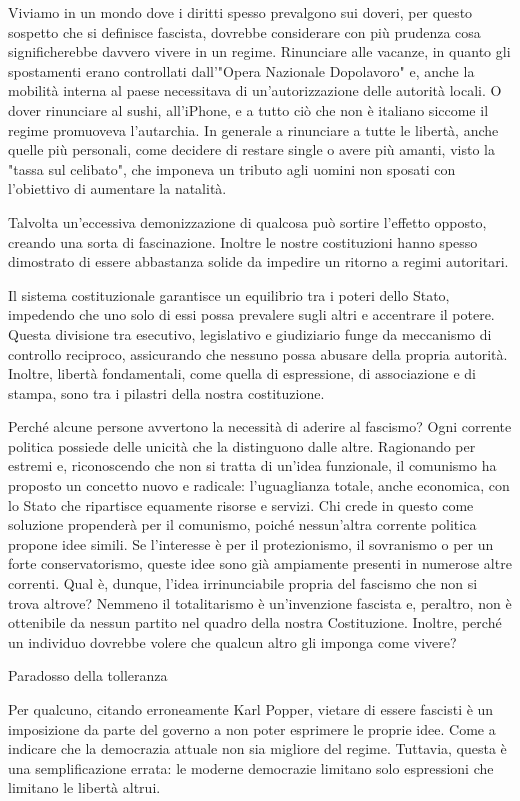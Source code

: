 \documentclass[12pt]{book} %
\begin{document}
Viviamo in un mondo dove i diritti spesso prevalgono sui doveri, per questo sospetto che si definisce fascista, dovrebbe considerare con più prudenza cosa significherebbe davvero vivere in un regime. Rinunciare alle vacanze, in quanto gli spostamenti erano controllati dall'"Opera Nazionale Dopolavoro" e, anche la mobilità interna al paese necessitava di un'autorizzazione delle autorità locali. O dover rinunciare al sushi, all'iPhone, e a tutto ciò che non è italiano siccome il regime promuoveva l'autarchia. In generale a rinunciare a tutte le libertà, anche quelle più personali, come decidere di restare single o avere più amanti, visto la "tassa sul celibato", che imponeva un tributo agli uomini non sposati con l'obiettivo di aumentare la natalità.

Talvolta un'eccessiva demonizzazione di qualcosa può sortire l’effetto opposto, creando una sorta di fascinazione. Inoltre le nostre costituzioni hanno spesso dimostrato di essere abbastanza solide da impedire un ritorno a regimi autoritari. 

Il sistema costituzionale garantisce un equilibrio tra i poteri dello Stato, impedendo che uno solo di essi possa prevalere sugli altri e accentrare il potere. Questa divisione tra esecutivo, legislativo e giudiziario funge da meccanismo di controllo reciproco, assicurando che nessuno possa abusare della propria autorità. Inoltre, libertà fondamentali, come quella di espressione, di associazione e di stampa, sono tra i pilastri della nostra costituzione.

Perché alcune persone avvertono la necessità di aderire al fascismo? Ogni corrente politica possiede delle unicità che la distinguono dalle altre. Ragionando per estremi e, riconoscendo che non si tratta di un'idea funzionale, il comunismo ha proposto un concetto nuovo e radicale: l'uguaglianza totale, anche economica, con lo Stato che ripartisce equamente risorse e servizi. Chi crede in questo come soluzione propenderà per il comunismo, poiché nessun'altra corrente politica propone idee simili. Se l'interesse è per il protezionismo, il sovranismo o per un forte conservatorismo, queste idee sono già ampiamente presenti in numerose altre correnti. Qual è, dunque, l'idea irrinunciabile propria del fascismo che non si trova altrove? Nemmeno il totalitarismo è un'invenzione fascista e, peraltro, non è ottenibile da nessun partito nel quadro della nostra Costituzione. Inoltre, perché un individuo dovrebbe volere che qualcun altro gli imponga come vivere?

\begin{mdframed}[linewidth=1pt]
Paradosso della tolleranza

Per qualcuno, citando erroneamente Karl Popper, vietare di essere fascisti è un imposizione da parte del governo a non poter esprimere le proprie idee. Come a indicare che la democrazia attuale non sia migliore del regime. 
Tuttavia, questa è una semplificazione errata: le moderne democrazie limitano solo espressioni che limitano le libertà altrui.
\end{mdframed}
\end{document}
